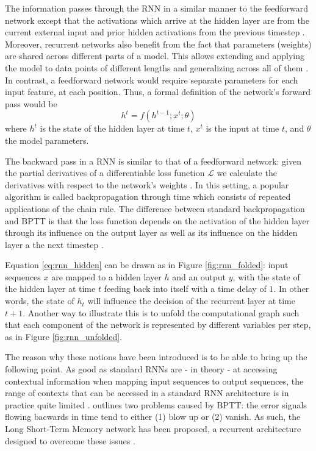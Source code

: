 \documentclass[a4paper]{book}
\begin{document}
The information passes through the RNN in a similar manner to the feedforward network except that the activations which arrive at the hidden layer are from the current external input and prior hidden activations from the previous timestep \parencite{graves_supervised_2012}. Moreover, recurrent networks also benefit from the fact that parameters (weights) are shared across different parts of a model. This allows extending and applying the model to data points of different lengths and generalizing across all of them \parencite{goodfellow_deep_2016}. In contrast, a feedforward network would require separate parameters for each input feature, at each position. Thus, a formal definition of the network's forward pass would be
\begin{equation}
    h^t = f(h^{t-1}; x^t; \theta) \label{eq:rnn_hidden}
\end{equation}
where $h^t$ is the state of the hidden layer at time $t$, $x^t$ is the input at time $t$, and $\theta$ the model parameters.

The backward pass in a RNN is similar to that of a feedforward network: given the partial derivatives of a differentiable loss function $\mathcal{L}$ we calculate the derivatives with respect to the network's weights \parencite{graves_supervised_2012}. In this setting, a popular algorithm is called backpropagation through time \parencite[BPTT;][]{werbos_backpropagation_1990} which consists of repeated applications of the chain rule. The difference between standard backpropagation and BPTT is that the loss function depends on the activation of the hidden layer through its influence on the output layer as well as its influence on the hidden layer a the next timestep \parencite{graves_supervised_2012}.

Equation \ref{eq:rnn_hidden} can be drawn as in Figure \ref{fig:rnn_folded}: input sequences $x$ are mapped to a hidden layer $h$ and an output $y$, with the state of the hidden layer at time $t$ feeding back into itself with a time delay of $1$. In other words, the state of $h_t$ will influence the decision of the recurrent layer at time $t+1$. Another way to illustrate this is to unfold the computational graph such that each component of the network is represented by different variables per step, as in Figure \ref{fig:rnn_unfolded}.

The reason why these notions have been introduced is to be able to bring up the following point. As good as standard RNNs are - in theory - at accessing contextual information when mapping input sequences to output sequences, the range of contexts that can be accessed in a standard RNN architecture is in practice quite limited \parencite{graves_supervised_2012}. \textcite{hochreiter_long_1997} outlines two problems caused by BPTT: the error signals flowing bacwards in time tend to either (1) blow up or (2) vanish. As such, the Long Short-Term Memory network has been proposed, a recurrent architecture designed to overcome these issues \parencite{hochreiter_long_1997}.
\end{document}
